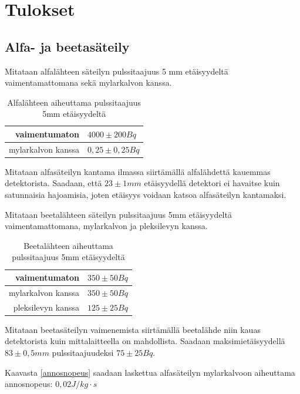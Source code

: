 \documentclass[a4paper,11pt]{article}
\begin{document}
\section{Tulokset}

\subsection{Alfa- ja beetasäteily}
\label{tulokset:alfabeeta}

Mitataan alfalähteen säteilyn pulssitaajuus 5 mm etäisyydeltä vaimentamattomana sekä mylarkalvon kanssa. 
\begin{table}[H]
\begin{center}
\caption{Alfalähteen aiheuttama pulssitaajuus 5mm etäisyydeltä}
\begin{tabular}{ | r | l | }
  \hline 
  vaimentumaton & $4000 \pm 200 Bq$ \\ \hline
  mylarkalvon kanssa & $0,25 \pm 0,25 Bq$ \\ \hline
\end{tabular}
\end{center}
\end{table}

Mitataan alfasäteilyn kantama ilmassa siirtämällä alfalähdettä kauemmas detektorista. Saadaan, että $23 \pm 1 mm$ etäisyydellä detektori ei havaitse kuin satunnaisia hajoamisia, joten etäisyys voidaan katsoa alfasäteilyn kantamaksi. 

Mitataan beetalähteen säteilyn pulssitaajuus 5mm etäisyydeltä vaimentamattomana, mylarkalvon ja pleksilevyn kanssa.
\begin{table}[H]
\begin{center}
\caption{Beetalähteen aiheuttama pulssitaajuus 5mm etäisyydeltä}
\begin{tabular}{ | r | l | }
  \hline
  vaimentumaton & $350 \pm 50 Bq$ \\ \hline
  mylarkalvon kanssa & $350 \pm 50 Bq$ \\ \hline
  pleksilevyn kanssa & $125 \pm 25 Bq$ \\ \hline
\end{tabular}
\end{center}
\end{table}
   
Mitataan beetasäteilyn vaimenemista siirtämällä beetalähde niin kauas detektorista kuin mittalaitteella on mahdollista. Saadaan maksimietäisyydellä $83 \pm 0,5 mm$ pulssitaajuudeksi $75 \pm 25 Bq$. 

Kaavasta \ref{annosnopeus} saadaan laskettua alfasäteilyn mylarkalvoon aiheuttama annosnopeus: $0,02 J/kg \cdot s$
\end{document}
